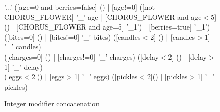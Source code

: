 \begin{subfigures}
	\begin{figure}
		\begin{rail}
			'...'
			([age=0 and berries=false] () | [age!=0] ([not CHORUS\_FLOWER] '\_' age | [CHORUS\_FLOWER and age$<$5] () | [CHORUS\_FLOWER and age=5] '\_1') | [berries=true] '\_1') \\
			([bites=0] () | [bites!=0] '\_' bites) ([candles$<$2] () | [candles$>$1] '\_' candles) \\
			([charges=0] () | [charges!=0] '\_' charges) ([delay$<$2] () | [delay$>$1] '\_' delay) \\
			([eggs$<$2]() | [eggs$>$1] '\_' eggs) ([pickles$<$2]() | [pickles$>$1] '\_' pickles)
		\end{rail}
		\caption{Integer modifier concatenation}
	\end{figure}
\end{subfigures}